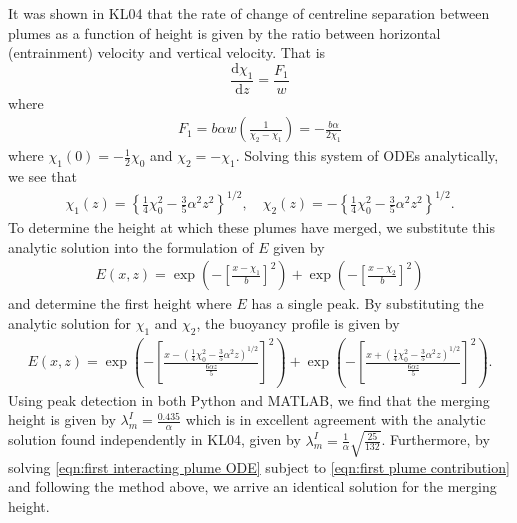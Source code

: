\documentclass{jfm}
\newcommand{\dbyd}[2]{\dfrac{\mathrm{d} #1}{\mathrm{d}#2}} %
\begin{document}
	\noindent It was shown in KL04 that the rate of change of centreline separation between plumes as a function of height is given by the ratio between horizontal (entrainment) velocity and vertical velocity. That is
	\begin{equation}
	\dbyd{\chi_1}{z} = \frac{F_1}{w} \label{eqn:first interacting plume ODE}
	\end{equation}
	where 
	\begin{align}
	F_1 = b\alpha w \left(\frac{1}{\chi_2 - \chi_1}\right) = -\frac{b\alpha}{2\chi_1} \label{eqn:first plume contribution}
	\end{align}
	where $\chi_1(0) = -\tfrac{1}{2}\chi_0$ and $\chi_2 = -\chi_1$. 
	Solving this system of ODEs analytically, we see that
	\begin{align}
		\chi_1(z) = \left\{\frac{1}{4}\chi_0^2 - \frac{3}{5}\alpha^2z^2 \right\}^{1/2}, \quad \chi_2(z) = -\left\{\frac{1}{4}\chi_0^2 - \frac{3}{5}\alpha^2z^2 \right\}^{1/2}.
	\end{align}
	To determine the height at which these plumes have merged, we substitute this analytic solution into the formulation of $E$ given by
	\begin{eqnarray}
	\displaystyle{E(x,z) = \exp\left(- \left[\frac{x - \chi_1}{b}\right]^2 \right) + \exp\left(- \left[\frac{x - \chi_2}{b}\right]^2\right)} \label{eqn:interacting two plume buoyancy}
	\end{eqnarray}
	and determine the first height where $E$ has a single peak.
	By substituting the analytic solution for $\chi_1$ and $\chi_2$, the buoyancy profile is given by		
	\begin{eqnarray}
	\displaystyle{E(x,z) = \exp\left(- \left[\frac{x - (\frac{1}{4}\chi_0^2 - \frac{3}{5}\alpha^2z)^{1/2}}{\frac{6\alpha z}{5}}\right]^2 \right) + \exp\left(- \left[\frac{x + (\frac{1}{4}\chi_0^2 - \frac{3}{5}\alpha^2z)^{1/2}}{\frac{6\alpha z}{5}}\right]^2\right)}
	.\label{eqn:two plume interacting buoyancy profile}
	\end{eqnarray}
	Using peak detection in both Python and MATLAB, we find that the merging height is given by $\lambda_m^I = \tfrac{0.435}{\alpha}$ which is in excellent agreement with the analytic solution found independently in KL04, given by $\lambda_m^I = \tfrac{1}{\alpha}\sqrt{\frac{25}{132}}$. Furthermore, by solving \eqref{eqn:first interacting plume ODE} subject to \eqref{eqn:first plume contribution} and following the method above, we arrive an identical solution for the merging height.
	
\end{document}
